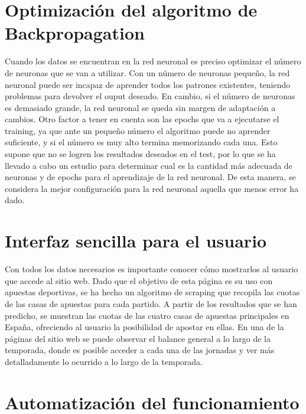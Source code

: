 \section{Optimización del algoritmo de Backpropagation}
Cuando los datos se encuentran en la red neuronal es preciso optimizar el número de neuronas que se van a utilizar. Con un número de neuronas pequeño, la red neuronal puede ser incapaz de aprender todos los patrones existentes, teniendo problemas para devolver el ouput deseado. En cambio, si el número de neuronas es demasiado grande, la red neuronal se queda sin margen de adaptación a cambios. Otro factor a tener en cuenta son las epochs que va a ejecutarse el training, ya que ante un pequeño número el algoritmo puede no aprender suficiente, y si el número es muy alto termina memorizando cada una. Esto supone que no se logren los resultados deseados en el test, por lo que se ha llevado a cabo un estudio para determinar cual es la cantidad más adecuada de neuronas y de epochs para el aprendizaje de la red neuronal.
De esta manera, se considera la mejor  configuración para la red neuronal aquella que menos  error ha dado.

\section{Interfaz sencilla para el usuario}

Con todos los datos necesarios es importante conocer cómo mostrarlos al usuario que accede al sitio web. Dado que el objetivo de esta página es su uso con apuestas deportivas, se ha hecho un algoritmo de scraping que recopila las cuotas de las casas de apuestas para cada partido.
A partir de los resultados que se han predicho, se muestran las cuotas de las cuatro casas de apuestas principales en España, ofreciendo al usuario la posibilidad de apostar en ellas.
En una de la páginas del sitio web se puede observar el balance general a lo largo de la temporada, donde es posible acceder a cada una de las jornadas y ver más detalladamente lo ocurrido a lo largo de la temporada.

\section{Automatización del funcionamiento}

